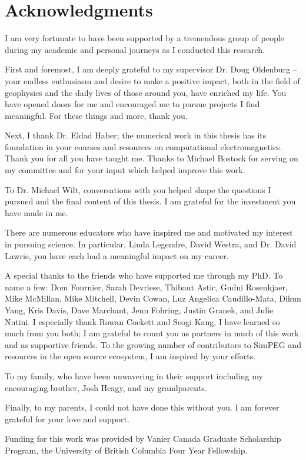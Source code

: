 
\chapter{Acknowledgments}

I am very fortunate to have been supported by a tremendous group of people during my academic and personal journeys as I conducted this research.

First and foremost, I am deeply grateful to my supervisor Dr. Doug Oldenburg -- your endless enthusiasm and desire to make a positive impact, both in the field of geophysics and the daily lives of those around you, have enriched my life. You have opened doors for me and encouraged me to pursue projects I find meaningful. For these things and more, thank you.

Next, I thank Dr. Eldad Haber; the numerical work in this thesis has its foundation in your courses and resources on computational electromagnetics. Thank you for all you have taught me. Thanks to Michael Bostock for serving on my committee and for your input which helped improve this work.

To Dr. Michael Wilt, conversations with you helped shape the questions I pursued and the final content of this thesis. I am grateful for the investment you have made in me.

There are numerous educators who have inspired me and motivated my interest in pursuing science. In particular, Linda Legendre, David Westra, and Dr. David Lawrie, you have each had a meaningful impact on my career.

A special thanks to the friends who have supported me through my PhD. To name a few: Dom Fournier, Sarah Devriese, Thibaut Astic, Gudni Rosenkjaer, Mike McMillan, Mike Mitchell, Devin Cowan, Luz Angelica Caudillo-Mata, Dikun Yang, Kris Davis, Dave Marchant, Jenn Fohring, Justin Granek, and Julie Nutini. I especially thank Rowan Cockett and Seogi Kang, I have learned so much from you both; I am grateful to count you as partners in much of this work and as supportive friends. To the growing number of contributors to SimPEG and resources in the open source ecosystem, I am inspired by your efforts.

To my family, who have been unwavering in their support including my encouraging brother, Josh Heagy, and my grandparents.

Finally, to my parents, I could not have done this without you. I am forever grateful for your love and support.

Funding for this work was provided by Vanier Canada Graduate Scholarship Program, the University of British Columbia Four Year Fellowship.
